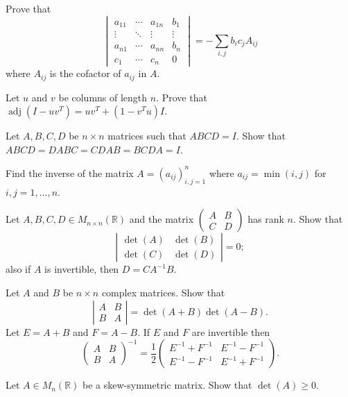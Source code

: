 \documentclass[12pt]{article}
\begin{document}
\begin{problems}
\item Prove that
\[
\begin{vmatrix}
a_{11} & \cdots & a_{1n} & b_1\\
\vdots & \ddots & \vdots & \vdots\\
a_{n1} & \cdots & a_{nn} & b_n\\
c_1 & \cdots & c_n & 0
\end{vmatrix} = -\sum_{i,j} b_ic_jA_{ij}
\]
where $A_{ij}$ is the cofactor of $a_{ij}$ in $A$.

\item Let $u$ and $v$ be columns of length $n$. Prove that $\operatorname{adj}(I-uv^T) = uv^T + (1-v^Tu)I$.

\item Let $A,B,C,D$ be $n\times n$ matrices such that $ABCD=I$. Show that $ABCD = DABC = CDAB = BCDA = I$.

\item Find the inverse of the matrix $A=(a_{ij})_{i,j=1}^n$ where $a_{ij}=\min(i,j)$ for $i,j=1,\dots,n$.

\item Let $A,B,C,D\in M_{n\times n}(\mathbb{R})$ and the matrix $\begin{pmatrix}A & B\\ C & D\end{pmatrix}$ has rank $n$. Show that
\[
\left|\begin{matrix}\det(A) & \det(B)\\ \det(C) & \det(D)\end{matrix}\right| = 0;
\]
also if $A$ is invertible, then $D=CA^{-1}B$.

\item Let $A$ and $B$ be $n\times n$ complex matrices. Show that
\[
\left|\begin{matrix} A & B\\ B & A\end{matrix}\right| = \det(A+B)\det(A-B).
\]
Let $E=A+B$ and $F=A-B$. If $E$ and $F$ are invertible then
\[
\begin{pmatrix}A & B\\ B & A\end{pmatrix}^{-1} = \frac12\begin{pmatrix} E^{-1}+F^{-1} & E^{-1}-F^{-1}\\ E^{-1}-F^{-1} & E^{-1}+F^{-1}\end{pmatrix}.
\]

\item Let $A\in M_n(\mathbb{R})$ be a skew-symmetric matrix. Show that $\det(A)\ge 0$.


\end{problems}
\end{document}
